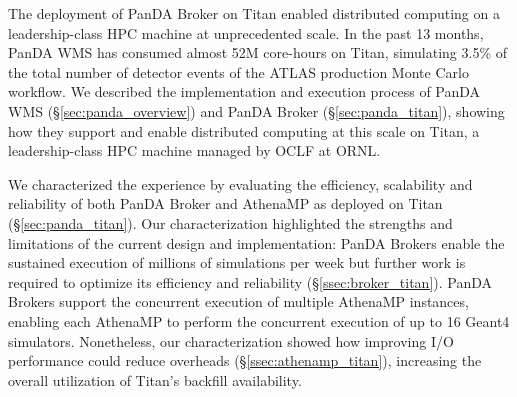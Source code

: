 
The deployment of PanDA Broker on Titan enabled distributed computing on a
leadership-class HPC machine at unprecedented scale. In the past 13 months,
PanDA WMS has consumed almost 52M core-hours on Titan, simulating 3.5\% of the
total number of detector events of the ATLAS production Monte Carlo workflow. We
described the implementation and execution process of PanDA WMS
(\S\ref{sec:panda_overview}) and PanDA Broker (\S\ref{sec:panda_titan}), showing
how they support and enable distributed computing at this scale on Titan, a
leadership-class HPC machine managed by OCLF at ORNL.

We characterized the experience by evaluating the efficiency, scalability
and reliability of both PanDA Broker and AthenaMP as deployed on Titan
(\S\ref{sec:panda_titan}). Our characterization highlighted the strengths
and limitations of the current design and implementation: PanDA Brokers enable
the sustained execution of millions of simulations per week but further work is
required to optimize its efficiency and reliability (\S\ref{ssec:broker_titan}).
PanDA Brokers support the concurrent execution of multiple AthenaMP instances,
enabling each AthenaMP to perform the concurrent execution of up to 16 Geant4
simulators. Nonetheless, our characterization showed how improving I/O
performance could reduce overheads (\S\ref{ssec:athenamp_titan}), increasing the
overall utilization of Titan's backfill availability.

